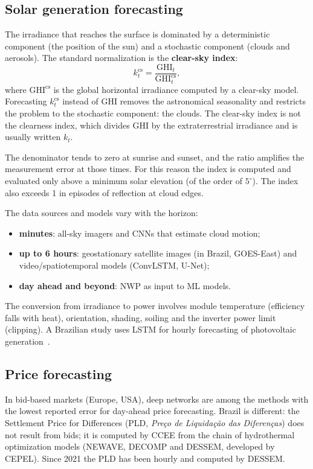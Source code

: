 \documentclass[10pt,a4paper,oneside]{article}
\begin{document}
\subsection{Solar generation forecasting}

The irradiance that reaches the surface is dominated by a deterministic
component (the position of the sun) and a stochastic component (clouds and
aerosols). The standard normalization is the \textbf{clear-sky index}:
\begin{equation}
  k^{\mathrm{cs}}_t = \frac{\mathrm{GHI}_t}{\mathrm{GHI}^{\mathrm{cs}}_t},
\end{equation}
where $\mathrm{GHI}^{\mathrm{cs}}$ is the global horizontal irradiance
computed by a clear-sky model. Forecasting $k^{\mathrm{cs}}_t$ instead of GHI
removes the astronomical seasonality and restricts the problem to the
stochastic component: the clouds. The clear-sky index is not the clearness
index, which divides GHI by the extraterrestrial irradiance and is usually
written $k_t$.

The denominator tends to zero at sunrise and sunset, and the ratio amplifies
the measurement error at those times. For this reason the index is computed
and evaluated only above a minimum solar elevation (of the order of
$5^\circ$). The index also exceeds 1 in episodes of reflection at cloud
edges.

The data sources and models vary with the horizon:
\begin{itemize}
  \item \textbf{minutes}: all-sky imagers and CNNs that estimate cloud
    motion;
  \item \textbf{up to 6 hours}: geostationary satellite images (in Brazil,
    GOES-East) and video/spatiotemporal models (ConvLSTM, U-Net);
  \item \textbf{day ahead and beyond}: NWP as input to ML models.
\end{itemize}

The conversion from irradiance to power involves module temperature
(efficiency falls with heat), orientation, shading, soiling and the inverter
power limit (clipping). A Brazilian study uses LSTM for hourly forecasting of
photovoltaic generation~\cite{pvlstm}.

\subsection{Price forecasting}

In bid-based markets (Europe, USA), deep networks are among the methods with
the lowest reported error for day-ahead price forecasting. Brazil is
different: the Settlement Price for Differences (PLD, \textit{Preço de
Liquidação das Diferenças}) does not result from bids; it is computed by CCEE
from the chain of hydrothermal optimization models (NEWAVE, DECOMP and
DESSEM, developed by CEPEL). Since 2021 the PLD has been hourly and computed
by DESSEM.
\end{document}
